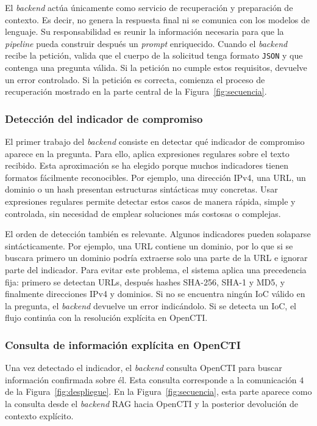 \documentclass[12pt]{report}
\begin{document}
El \textit{backend} actúa únicamente como servicio de recuperación y preparación de contexto. Es decir, no genera la respuesta final ni se comunica con los modelos de lenguaje. Su responsabilidad es reunir la información necesaria para que la \textit{pipeline} pueda construir después un \textit{prompt} enriquecido. Cuando el \textit{backend} recibe la petición, valida que el cuerpo de la solicitud tenga formato \texttt{JSON} y que contenga una pregunta válida. Si la petición no cumple estos requisitos, devuelve un error controlado. Si la petición es correcta, comienza el proceso de recuperación mostrado en la parte central de la Figura~\ref{fig:secuencia}.

\subsubsection*{Detección del indicador de compromiso}

El primer trabajo del \textit{backend} consiste en detectar qué indicador de compromiso aparece en la pregunta. Para ello, aplica expresiones regulares sobre el texto recibido. Esta aproximación se ha elegido porque muchos indicadores tienen formatos fácilmente reconocibles. Por ejemplo, una dirección IPv4, una URL, un dominio o un hash presentan estructuras sintácticas muy concretas. Usar expresiones regulares permite detectar estos casos de manera rápida, simple y controlada, sin necesidad de emplear soluciones más costosas o complejas.

El orden de detección también es relevante. Algunos indicadores pueden solaparse sintácticamente. Por ejemplo, una URL contiene un dominio, por lo que si se buscara primero un dominio podría extraerse solo una parte de la URL e ignorar parte del indicador. Para evitar este problema, el sistema aplica una precedencia fija: primero se detectan URLs, después hashes SHA-256, SHA-1 y MD5, y finalmente direcciones IPv4 y dominios. Si no se encuentra ningún IoC válido en la pregunta, el \textit{backend} devuelve un error indicándolo. Si se detecta un IoC, el flujo continúa con la resolución explícita en OpenCTI.

\subsubsection*{Consulta de información explícita en OpenCTI}

Una vez detectado el indicador, el \textit{backend} consulta OpenCTI para buscar información confirmada sobre él. Esta consulta corresponde a la comunicación $4$ de la Figura~\ref{fig:despliegue}. En la Figura~\ref{fig:secuencia}, esta parte aparece como la consulta desde el \textit{backend} RAG hacia OpenCTI y la posterior devolución de contexto explícito.
\end{document}
